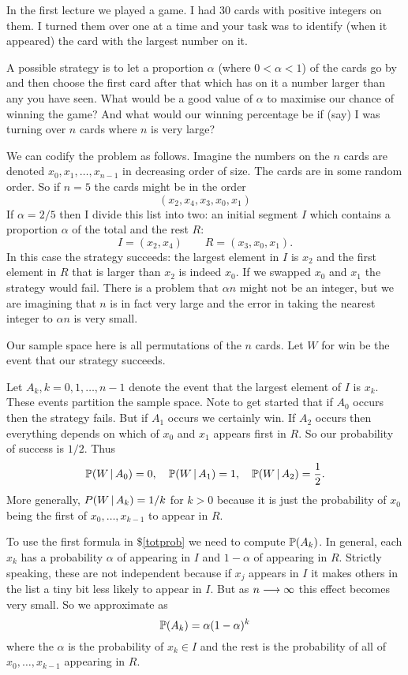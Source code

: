 {\color{red}
In the first lecture we played a game. I had 30 cards with positive integers on them. I turned them over one at a time and your task was to identify (when it appeared) the card with the largest number on it. 

A possible strategy is to let a proportion $\alpha$ (where $0 < \alpha < 1$) of the cards go by and then choose the first card after that which has on it a number larger than any you have seen.  What would be a good value of $\alpha$ to maximise our chance of winning the game? And what would our winning percentage be if (say) I was turning over $n$ cards where $n$ is very large? 

We can codify the problem as follows. Imagine the numbers on the $n$ cards are denoted $x_0, x_1, \dots , x_{n-1}$ in decreasing order of size. The cards are in some random order.  So if $n=5$ the cards might be in the order 
 \[
       ( x_2, x_4, x_3, x_0, x_1) 
 \]
 If $\alpha = 2/5$ then I divide this list into two: an initial segment $I$ which contains a proportion $\alpha$ of the total and the rest $R$:
  \[
     I = ( x_2, x_4 ) \qquad R = (x_3, x_0, x_1).
  \]
 In this case the strategy succeeds: the largest element in $I$ is $x_2$ and the first element in $R$ that is larger than $x_2$ is indeed $x_0$.  If we swapped $x_0$ and $x_1$ the strategy would fail. There is a problem that $\alpha n$ might not be an integer, but we are imagining that $n$ is in fact  very large and the error in taking the nearest integer to $\alpha n$ is very small. 
 
 Our sample space here is all permutations of the $n$ cards.  Let $W$ for win be the event that our strategy succeeds.  
 
 Let $A_k, k = 0,1,\dots, n-1$ denote the event that the largest element of $I$ is $x_k$. These events partition the sample space. Note to get started that if $A_0$ occurs then the strategy fails. But if $A_1$ occurs we certainly win. If $A_2$ occurs then everything depends on which of $x_0$ and $x_1$ appears first in $R$. So our probability of success is $1/2$. Thus 
  \[
     {\mathbb P}(W \, | \, A_0) = 0, \quad {\mathbb P}(W \, | \, A_1) = 1, \quad {\mathbb P}(W \, | \, A_2) = \frac12. 
  \]
More generally, $P(W \, | \, A_k) = 1/k$ for $k>0$ because it is just the probability of $x_0$ being the first of $x_0, \dots , x_{k-1}$ to appear in $R$. 

To use the first formula in \$\ref{totprob} we need to compute ${\mathbb P}(A_k)$. In general, each $x_k$ has a probability $\alpha$ of appearing in $I$ and $1-\alpha$ of appearing in $R$. Strictly speaking, these are not independent because if $x_j$ appears in $I$ it makes others in the list a tiny bit less likely to appear in $I$.  But as $n \longrightarrow \infty$ this effect becomes very small. So we approximate as 
 \[
    {\mathbb P}( A_k) = \alpha (1- \alpha)^k
 \]
where the $\alpha$ is the probability of $x_k \in I$ and the rest is the probability of all of $x_0, \dots , x_{k-1}$ appearing in $R$. 

}
